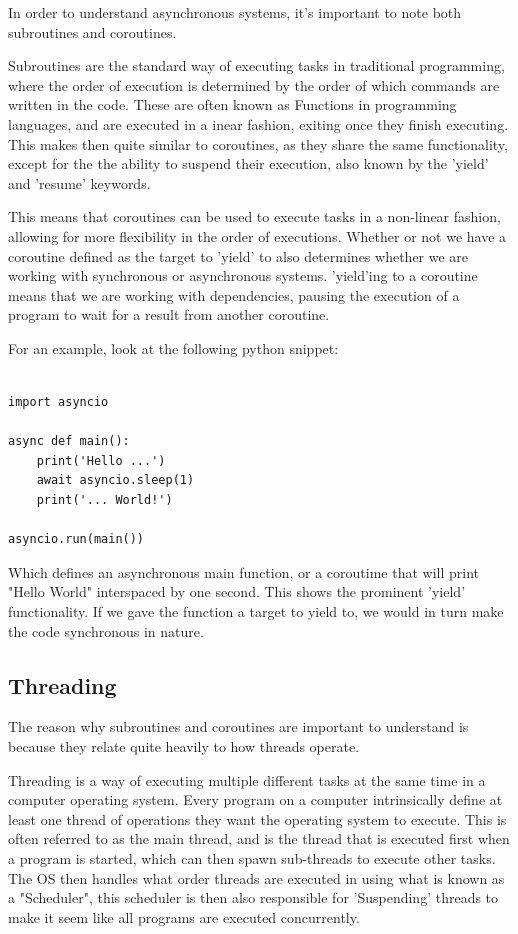 \documentclass{article}
\begin{document}
In order to understand asynchronous systems, it's important to note both subroutines and coroutines. 

Subroutines are the standard way of executing tasks in traditional programming, where the order of execution is determined by the order of which commands are written in the code. These are often known as Functions in programming languages, and are executed in a inear fashion, exiting once they finish executing. This makes then quite similar to coroutines, as they share the same functionality, except for the the ability to suspend their execution, also known by the 'yield' and 'resume' keywords. 

This means that coroutines can be used to execute tasks in a non-linear fashion, allowing for more flexibility in the order of executions. Whether or not we have a coroutine defined as the target to 'yield' to also determines whether we are working with synchronous or asynchronous systems. 'yield'ing to a coroutine means that we are working with dependencies, pausing the execution of a program to wait for a result from another coroutine. 

For an example, look at the following python snippet:
\begin{verbatim}

import asyncio

async def main():
    print('Hello ...')
    await asyncio.sleep(1)
    print('... World!')

asyncio.run(main())
\end{verbatim}

Which defines an asynchronous main function, or a coroutime that will print "Hello World" interspaced by one second. This shows the prominent 'yield' functionality. If we gave the function a target to yield to, we would in turn make the code synchronous in nature.

\subsection{Threading}

The reason why subroutines and coroutines are important to understand is because they relate quite heavily to how threads operate. 

Threading is a way of executing multiple different tasks at the same time in a computer operating system. Every program on a computer intrinsically define at least one thread of operations they want the operating system to execute. This is often referred to as the main thread, and is the thread that is executed first when a program is started, which can then spawn sub-threads to execute other tasks. The OS then handles what order threads are executed in using what is known as a "Scheduler", this scheduler is then also responsible for 'Suspending' threads to make it seem like all programs are executed concurrently. 
\end{document}
